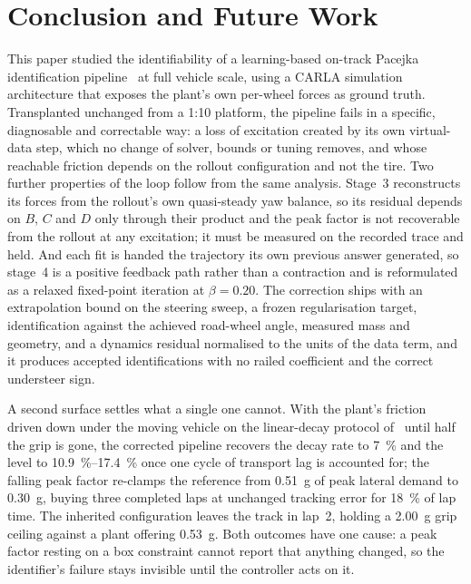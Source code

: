 \section{Conclusion and Future Work}
\label{sec:conclusion}

This paper studied the identifiability of a learning-based on-track Pacejka
identification pipeline~\cite{ontrack2025} at full vehicle scale, using a CARLA
simulation architecture that exposes the plant's own per-wheel forces as ground
truth. Transplanted unchanged from a 1:10 platform, the pipeline fails in a
specific, diagnosable and correctable way: a loss of excitation created by its
own virtual-data step, which no change of solver, bounds or tuning removes, and
whose reachable friction depends on the rollout configuration and not the tire.
Two further properties of the loop follow from the same analysis. Stage~3
reconstructs its forces from the rollout's own quasi-steady yaw balance, so its
residual depends on $B$, $C$ and $D$ only through their product and the peak
factor is not recoverable from the rollout at any excitation; it must be
measured on the recorded trace and held. And each fit is handed the trajectory
its own previous answer generated, so stage~4 is a positive feedback path
rather than a contraction and is reformulated as a relaxed fixed-point
iteration at $\beta=\num{0.20}$. The correction ships with an extrapolation
bound on the steering sweep, a frozen regularisation target, identification
against the achieved road-wheel angle, measured mass and geometry, and a
dynamics residual normalised to the units of the data term, and it produces
accepted identifications with no railed coefficient and the correct understeer
sign.

A second surface settles what a single one cannot. With the plant's friction
driven down under the moving vehicle on the linear-decay protocol
of~\cite{llampc2025} until half the grip is gone, the corrected pipeline
recovers the decay rate to \SI{7}{\percent} and the level to
\SIrange{10.9}{17.4}{\percent} once one cycle of transport lag is accounted
for; the falling peak factor re-clamps the reference from \SI{0.51}{\g} of peak
lateral demand to \SI{0.30}{\g}, buying three completed laps at unchanged
tracking error for \SI{18}{\percent} of lap time. The inherited configuration
leaves the track in lap~2, holding a \SI{2.00}{\g} grip ceiling against a plant
offering \SI{0.53}{\g}. Both outcomes have one cause: a peak factor resting on
a box constraint cannot report that anything changed, so the identifier's
failure stays invisible until the controller acts on it.

